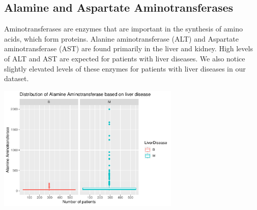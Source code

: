 \documentclass[]{article}
\newenvironment{Shaded}{\begin{snugshade}}{\end{snugshade}}
\newcommand{\CommentTok}[1]{\textcolor[rgb]{0.56,0.35,0.01}{\textit{#1}}}
\newcommand{\DataTypeTok}[1]{\textcolor[rgb]{0.13,0.29,0.53}{#1}}
\newcommand{\KeywordTok}[1]{\textcolor[rgb]{0.13,0.29,0.53}{\textbf{#1}}}
\newcommand{\NormalTok}[1]{#1}
\newcommand{\OperatorTok}[1]{\textcolor[rgb]{0.81,0.36,0.00}{\textbf{#1}}}
\newcommand{\StringTok}[1]{\textcolor[rgb]{0.31,0.60,0.02}{#1}}
\begin{document}
\subsection{Alamine and Aspartate Aminotransferases}

Aminotransferases are enzymes that are important in the synthesis of
amino acids, which form proteins. Alanine aminotransferase (ALT) and
Aspartate aminotransferase (AST) are found primarily in the liver and
kidney. High levels of ALT and AST are expected for patients with liver
diseases. We also notice slightly elevated levels of these enzymes for
patients with liver diseases in our dataset.

\begin{Shaded}
\end{Shaded}

\begin{center}
\includegraphics[width=0.65\textwidth]{LiverDisease_files/figure-latex/unnamed-chunk-18-1.pdf}
\end{center}
\end{document}

